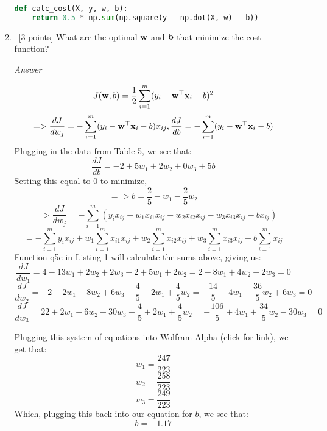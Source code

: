 \documentclass[12pt, fullpage,letterpaper]{article}
\begin{document}
\begin{enumerate}
\begin{enumerate}
\begin{lstlisting}[language=Python, caption=QuestionAnswers.part1]
def calc_cost(X, y, w, b):
    return 0.5 * np.sum(np.square(y - np.dot(X, w) - b))


	\end{lstlisting}
	
	\item~[3 points] What are the optimal ${\bf w}$ and ${\bf b}$ that minimize the cost function? 
	
	\emph{Answer}
	
	\[
	    J({\bf w}, b) = \frac{1}{2} \sum_{i=1}^m (y_i - {\bf w}^\top {\bf x}_i - b)^2
	\]
	\[
        => \frac{dJ}{dw_j} = -\sum_{i=1}^m (y_i - {\bf w}^\top {\bf x}_i - b)x_{ij},  \frac{dJ}{db} = -\sum_{i=1}^m (y_i - {\bf w}^\top {\bf x}_i - b)
    \]
    Plugging in the data from Table 5, we see that:
    \[
       \frac{dJ}{db} = -2 + 5w_1 +2 w_2 + 0w_3 + 5b
    \]
    Setting this equal to 0 to minimize,
    \[
        => b = \frac{2}{5} - w_1 - \frac{2}{5}w_2
    \]
    \[
        => \frac{dJ}{dw_j} = -\sum_{i=1}^m (y_i x_{ij} - w_1 x_{i1} x_{ij} - w_2 x_{i2} x_{ij} - w_3 x_{i3} x_{ij} - b x_{ij})
    \]
    \[
        = -\sum_{i=1}^m y_i x_{ij} + w_1\sum_{i=1}^m x_{i1} x_{ij} + w_2\sum_{i=1}^m x_{i2} x_{ij} + w_3\sum_{i=1}^m x_{i3} x_{ij} + b\sum_{i=1}^m x_{ij}
    \]
    Function q5c in Listing 1 will calculate the sums above, giving us:
    \[
        \frac{dJ}{dw_1} = 4 - 13w_1 + 2w_2 + 2w_3 - 2 + 5w_1 + 2w_2 = 2 - 8w_1 + 4w_2 + 2w_3 = 0
    \]
    \[
        \frac{dJ}{dw_2} = -2 + 2w_1 - 8w_2 + 6w_3 - \frac{4}{5} + 2w_1 + \frac{4}{5}w_2 = -\frac{14}{5} + 4w_1 - \frac{36}{5}w_2 + 6w_3 = 0
    \]
    \[
        \frac{dJ}{dw_3} = 22 + 2w_1 + 6w_2 - 30w_3 - \frac{4}{5} + 2w_1 + \frac{4}{5}w_2 = -\frac{106}{5} + 4w_1 + \frac{34}{5}w_2 - 30w_3 = 0
    \]
    
    Plugging this system of equations into \href{https://www.wolframalpha.com/input/?i=systems+of+equations+calculator&assumption=%7B%22F%22%2C+%22SolveSystemOf3EquationsCalculator%22%2C+%22equation1%22%7D+-%3E%222-8a%2B4b%2B2c%22&assumption=%22FSelect%22+-%3E+%7B%7B%22SolveSystemOf3EquationsCalculator%22%7D%7D&assumption=%7B%22F%22%2C+%22SolveSystemOf3EquationsCalculator%22%2C+%22equation2%22%7D+-%3E%22-14%2F5%2B4a-36%2F5b%2B6c%22&assumption=%7B%22F%22%2C+%22SolveSystemOf3EquationsCalculator%22%2C+%22equation3%22%7D+-%3E%22106%2F5%2B4a%2B34%2F5b-30c%22}{Wolfram Alpha} (click for link), we get that:
    \[
        w_1 = \frac{247}{223}
    \]
    \[
        w_2 = \frac{258}{223}
    \]
    \[
        w_3 = \frac{249}{223}
    \]
    Which, plugging this back into our equation for $b$, we see that:
    \[
        b = -1.17
    \]
	

\end{enumerate}
\end{enumerate}
\end{document}
